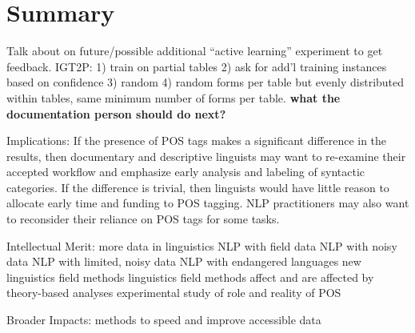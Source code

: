 \chapter{Summary}
\label{chap:conclusion}


Talk about on future/possible additional ``active learning'' experiment to get feedback.
IGT2P:
1) train on partial tables
2) ask for add'l training instances based on confidence
3) random
4) random forms per table but evenly distributed within tables, same minimum number of forms per table.
\textbf{what the documentation person should do next?}

Implications:
If the presence of POS tags makes a significant difference in the results, then documentary and descriptive linguists may want to re-examine their accepted workflow and emphasize early analysis and labeling of syntactic categories. If the difference is trivial, then linguists would have little reason to allocate early time and funding to POS tagging. NLP practitioners may also want to reconsider their reliance on POS tags for some tasks. 


Intellectual Merit:
more data in linguistics
NLP with field data
NLP with noisy data
NLP with limited, noisy data
NLP with endangered languages
new linguistics field methods
linguistics field methods affect and are affected by theory-based analyses
experimental study of role and reality of POS


Broader Impacts:
methods to speed and improve accessible data
